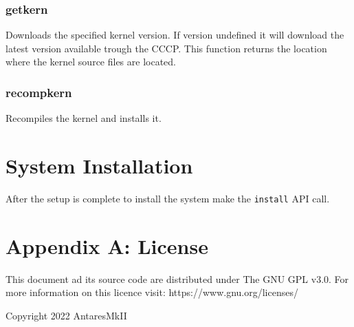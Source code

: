 \documentclass{scrartcl}
\begin{document}
\subsubsection{getkern}
Downloads the specified kernel version. If version undefined it will download
the latest version available trough the CCCP. This function returns the location
where the kernel source files are located.
\subsubsection{recompkern}
Recompiles the kernel and installs it.

\section{System Installation}
After the setup is complete to install the system make the \texttt{install}
API call.

\section{Appendix A: License}
This document ad its source code are distributed under The GNU GPL v3.0. For
more information on this licence visit: https://www.gnu.org/licenses/

Copyright 2022 AntaresMkII
\end{document}
